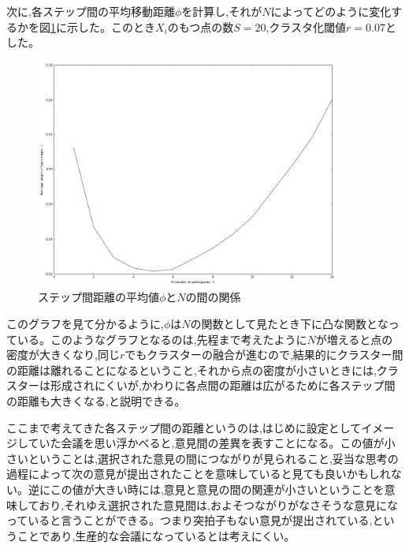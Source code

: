次に,各ステップ間の平均移動距離$\phi$を計算し,それが$N$によってどのように変化するかを図\ref{fig:f24}に示した。このとき$X_{i}$のもつ点の数$S=20$,クラスタ化閾値$r=0.07$とした。
\begin{figure}[H]
    \begin{center}
        \includegraphics[width=10cm]{../img/N_l_2.png}
        \caption{ステップ間距離の平均値$\phi$と$N$の間の関係}
        \label{fig:f24}
    \end{center}
\end{figure}
このグラフを見て分かるように,$\phi$は$N$の関数として見たとき下に凸な関数となっている。このようなグラフとなるのは,先程まで考えたように$N$が増えると点の密度が大きくなり,同じ$r$でもクラスターの融合が進むので,結果的にクラスター間の距離は離れることになるということ,それから点の密度が小さいときには,クラスターは形成されにくいが,かわりに各点間の距離は広がるために各ステップ間の距離も大きくなる,と説明できる。

ここまで考えてきた各ステップ間の距離というのは,はじめに設定としてイメージしていた会議を思い浮かべると,意見間の差異を表すことになる。この値が小さいということは,選択された意見の間につながりが見られること,妥当な思考の過程によって次の意見が提出されたことを意味していると見ても良いかもしれない。逆にこの値が大きい時には,意見と意見の間の関連が小さいということを意味しており,それゆえ選択された意見間は,およそつながりがなさそうな意見になっていると言うことができる。つまり突拍子もない意見が提出されている,ということであり,生産的な会議になっているとは考えにくい。
